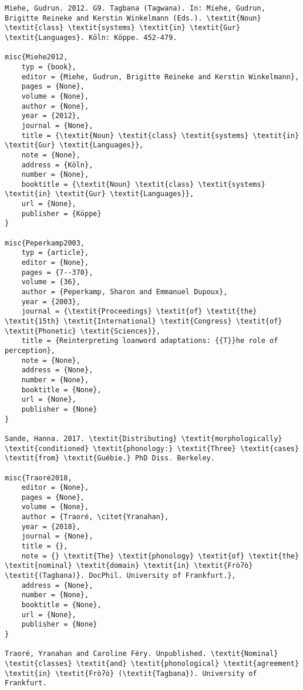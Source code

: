 \begin{verbatim}
Miehe, Gudrun. 2012. G9. Tagbana (Tagwana). In: Miehe, Gudrun, Brigitte Reineke and Kerstin Winkelmann (Eds.). \textit{Noun} \textit{class} \textit{systems} \textit{in} \textit{Gur} \textit{Languages}. Köln: Köppe. 452-479.

misc{Miehe2012,
	typ = {book},
	editor = {Miehe, Gudrun, Brigitte Reineke and Kerstin Winkelmann},
	pages = {None},
	volume = {None},
	author = {None},
	year = {2012},
	journal = {None},
	title = {\textit{Noun} \textit{class} \textit{systems} \textit{in} \textit{Gur} \textit{Languages}},
	note = {None},
	address = {Köln},
	number = {None},
	booktitle = {\textit{Noun} \textit{class} \textit{systems} \textit{in} \textit{Gur} \textit{Languages}},
	url = {None},
	publisher = {Köppe}
}

misc{Peperkamp2003,
	typ = {article},
	editor = {None},
	pages = {7--370},
	volume = {36},
	author = {Peperkamp, Sharon and Emmanuel Dupoux},
	year = {2003},
	journal = {\textit{Proceedings} \textit{of} \textit{the} \textit{15th} \textit{International} \textit{Congress} \textit{of} \textit{Phonetic} \textit{Sciences}},
	title = {Reinterpreting loanword adaptations: {{T}}he role of perception},
	note = {None},
	address = {None},
	number = {None},
	booktitle = {None},
	url = {None},
	publisher = {None}
}

Sande, Hanna. 2017. \textit{Distributing} \textit{morphologically} \textit{conditioned} \textit{phonology:} \textit{Three} \textit{cases} \textit{from} \textit{Guébie.} PhD Diss. Berkeley.

misc{Traoré2018,
	editor = {None},
	pages = {None},
	volume = {None},
	author = {Traoré, \citet{Yranahan},
	year = {2018},
	journal = {None},
	title = {},
	note = {} \textit{The} \textit{phonology} \textit{of} \textit{the} \textit{nominal} \textit{domain} \textit{in} \textit{Fròʔò} \textit{(Tagbana)}. DocPhil. University of Frankfurt.},
	address = {None},
	number = {None},
	booktitle = {None},
	url = {None},
	publisher = {None}
}

Traoré, Yranahan and Caroline Féry. Unpublished. \textit{Nominal} \textit{classes} \textit{and} \textit{phonological} \textit{agreement} \textit{in} \textit{Fròʔò} (\textit{Tagbana}). University of Frankfurt.

\end{verbatim}
